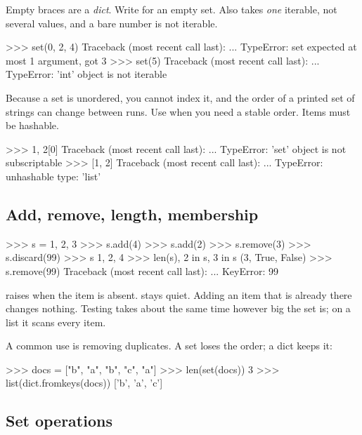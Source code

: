 \begin{trap}
Empty braces are a \emph{dict}. Write  for an empty set. Also  takes \emph{one}
iterable, not several values, and a bare number is not iterable.
\end{trap}

\begin{pycode}
>>> set(0, 2, 4)
Traceback (most recent call last):
  ...
TypeError: set expected at most 1 argument, got 3
>>> set(5)
Traceback (most recent call last):
  ...
TypeError: 'int' object is not iterable
\end{pycode}

Because a set is unordered, you cannot index it, and the order of a printed set of strings can change
between runs. Use  when you need a stable order. Items must be hashable.

\begin{pycode}
>>> {1, 2}[0]
Traceback (most recent call last):
  ...
TypeError: 'set' object is not subscriptable
>>> {[1, 2]}
Traceback (most recent call last):
  ...
TypeError: unhashable type: 'list'
\end{pycode}

\subsection{Add, remove, length, membership}

\begin{pycode}
>>> s = {1, 2, 3}
>>> s.add(4)
>>> s.add(2)
>>> s.remove(3)
>>> s.discard(99)
>>> s
{1, 2, 4}
>>> len(s), 2 in s, 3 in s
(3, True, False)
>>> s.remove(99)
Traceback (most recent call last):
  ...
KeyError: 99
\end{pycode}

 raises  when the item is absent.  stays quiet. Adding an item
that is already there changes nothing. Testing  takes about the same time however big the set
is; on a list it scans every item.

A common use is removing duplicates. A set loses the order; a dict keeps it:

\begin{pycode}
>>> docs = ["b", "a", "b", "c", "a"]
>>> len(set(docs))
3
>>> list(dict.fromkeys(docs))
['b', 'a', 'c']
\end{pycode}

\subsection{Set operations}

